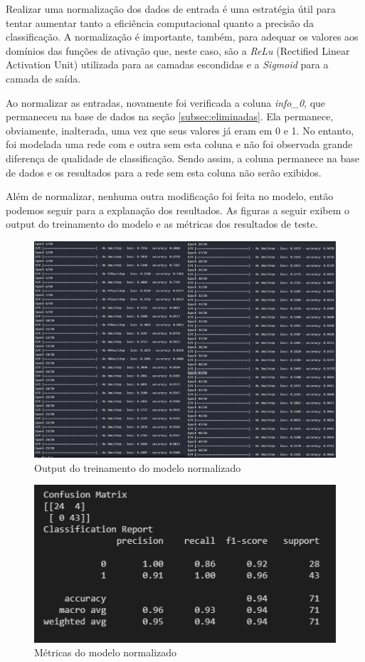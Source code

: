 \documentclass[12pt]{article}
\begin{document}
Realizar uma normalização dos dados de entrada é uma estratégia útil para tentar aumentar tanto a eficiência computacional quanto a precisão da classificação. A normalização é importante, também, para adequar os valores aos domínios das funções de ativação que, neste caso, são a \textit{ReLu} (Rectified Linear Activation Unit) utilizada para as camadas escondidas e a \textit{Sigmoid} para a camada de saída.

Ao normalizar as entradas, novamente foi verificada a coluna \textit{info\_0}, que permaneceu na base de dados na seção \ref{subsec:eliminadas}. Ela permanece, obviamente, inalterada, uma vez que seus valores já eram em 0 e 1. No entanto, foi modelada uma rede com e outra sem esta coluna e não foi observada grande diferença de qualidade de classificação. Sendo assim, a coluna permanece na base de dados e os resultados para a rede sem esta coluna não serão exibidos.

Além de normalizar, nenhuma outra modificação foi feita no modelo, então podemos seguir para a explanação dos resultados. As figuras a seguir exibem o output do treinamento do modelo e as métricas dos resultados de teste.

\begin{figure}[H]
	\centering
	\includegraphics[width=1.1\linewidth]{Imagens/Fit_Normalizada}
	\caption{Output do treinamento do modelo normalizado}
	\label{fig:fitnormalizada}
\end{figure}
\begin{figure}[H]
	\centering
	\includegraphics[width=0.7\linewidth]{Imagens/resultadoNormalizada}
	\caption{Métricas do modelo normalizado}
	\label{fig:resultadonormalizada}
\end{figure}
\end{document}
